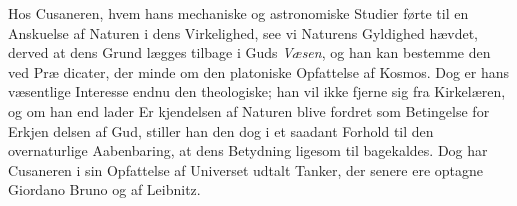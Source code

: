 \documentclass[12pt,a4paper]{book}
\begin{document}
Hos Cusaneren, hvem hans mechaniske og astronomiske
Studier førte til en Anskuelse af Naturen i dens Virkelighed, see
vi Naturens Gyldighed hævdet, derved at dens Grund lægges
tilbage i Guds \emph{Væsen}, og han kan bestemme den ved Præ\-%
dicater, der minde om den platoniske Opfattelse af Kosmos.
Dog er hans væsentlige Interesse endnu den theologiske; han
vil ikke fjerne sig fra Kirkelæren, og om han end lader Er\-%
kjendelsen af Naturen blive fordret som Betingelse for Erkjen\-%
delsen af Gud, stiller han den dog i et saadant Forhold til
den overnaturlige Aabenbaring, at dens Betydning ligesom til\-%
bagekaldes. Dog har Cusaneren i sin Opfattelse af Universet
udtalt Tanker, der senere ere optagne Giordano Bruno og af
Leibnitz.
\end{document}
